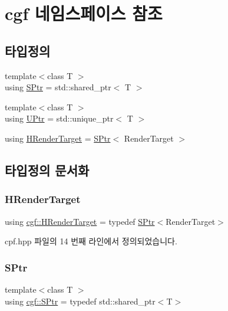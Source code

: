 \hypertarget{namespacecgf}{}\section{cgf 네임스페이스 참조}
\label{namespacecgf}
\subsection*{타입정의}
\begin{DoxyCompactItemize}
\item 
{\footnotesize template$<$class T $>$ }\\using \hyperlink{namespacecgf_a176bca5a84966f9e4be86aec28b5c402}{S\+Ptr} = std\+::shared\+\_\+ptr$<$ T $>$
\item 
{\footnotesize template$<$class T $>$ }\\using \hyperlink{namespacecgf_a4eedd20a933c30d03183a0f373dc21ab}{U\+Ptr} = std\+::unique\+\_\+ptr$<$ T $>$
\item 
using \hyperlink{namespacecgf_ae6788b918c2e375268c81ca68db17add}{H\+Render\+Target} = \hyperlink{namespacecgf_a176bca5a84966f9e4be86aec28b5c402}{S\+Ptr}$<$ Render\+Target $>$
\end{DoxyCompactItemize}


\subsection{타입정의 문서화}
\mbox{\label{namespacecgf_ae6788b918c2e375268c81ca68db17add}} 
\subsubsection{\texorpdfstring{H\+Render\+Target}{HRenderTarget}}
{\footnotesize\ttfamily using \hyperlink{namespacecgf_ae6788b918c2e375268c81ca68db17add}{cgf\+::\+H\+Render\+Target} = typedef \hyperlink{namespacecgf_a176bca5a84966f9e4be86aec28b5c402}{S\+Ptr}$<$Render\+Target$>$}



cpf.\+hpp 파일의 14 번째 라인에서 정의되었습니다.

\mbox{\label{namespacecgf_a176bca5a84966f9e4be86aec28b5c402}} 
\subsubsection{\texorpdfstring{S\+Ptr}{SPtr}}
{\footnotesize\ttfamily template$<$class T $>$ \\
using \hyperlink{namespacecgf_a176bca5a84966f9e4be86aec28b5c402}{cgf\+::\+S\+Ptr} = typedef std\+::shared\+\_\+ptr$<$T$>$}



